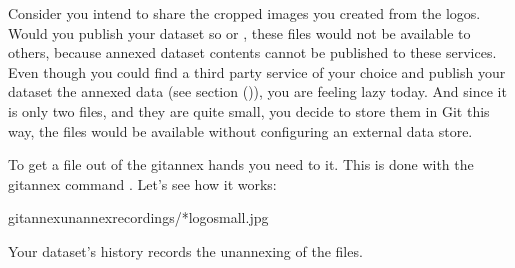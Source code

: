 \sphinxAtStartPar
Consider you intend to share the cropped  images you created from the
 logos. Would you publish your  dataset so {\hyperref[\detokenize{glossary:term-GitHub}]{}}
or {\hyperref[\detokenize{glossary:term-GitLab}]{}}, these files would not be available to others, because annexed
dataset contents cannot be published to these services.
Even though you could find a third party service of your choice
and publish your dataset  the annexed data (see section {\hyperref[\detokenize{basics/101-138-sharethirdparty:sharethirdparty}]{}} ()),
you are feeling lazy today. And since it
is only two files, and they are quite small, you decide to store them in Git \textendash{}
this way, the files would be available without configuring an external data
store.

\sphinxAtStartPar
To get a file out of the git\sphinxhyphen{}annex hands you need to  it. This is
done with the git\sphinxhyphen{}annex command . Let’s see how it
works:

\begin{sphinxVerbatim}[commandchars=\\\{\}]
gitannexunannexrecordings/*logo\PYGZus{}small.jpg
\end{sphinxVerbatim}

\sphinxAtStartPar
Your dataset’s history records the unannexing of the files.

